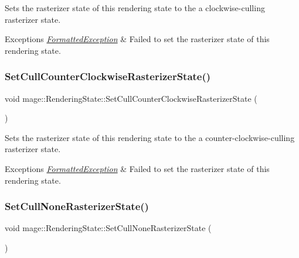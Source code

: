 Sets the rasterizer state of this rendering state to the a clockwise-\/culling rasterizer state.


\begin{DoxyExceptions}{Exceptions}
{\em \hyperlink{structmage_1_1_formatted_exception}{Formatted\+Exception}} & Failed to set the rasterizer state of this rendering state. \\
\hline
\end{DoxyExceptions}
\hypertarget{structmage_1_1_rendering_state_aa66215168ce8752ef20065b161bad1fc}{}\label{structmage_1_1_rendering_state_aa66215168ce8752ef20065b161bad1fc} 
\subsubsection{\texorpdfstring{Set\+Cull\+Counter\+Clockwise\+Rasterizer\+State()}{SetCullCounterClockwiseRasterizerState()}}
{\footnotesize\ttfamily void mage\+::\+Rendering\+State\+::\+Set\+Cull\+Counter\+Clockwise\+Rasterizer\+State (\begin{DoxyParamCaption}{ }\end{DoxyParamCaption})}

Sets the rasterizer state of this rendering state to the a counter-\/clockwise-\/culling rasterizer state.


\begin{DoxyExceptions}{Exceptions}
{\em \hyperlink{structmage_1_1_formatted_exception}{Formatted\+Exception}} & Failed to set the rasterizer state of this rendering state. \\
\hline
\end{DoxyExceptions}
\hypertarget{structmage_1_1_rendering_state_a4841e36e7be34f949da1d4088f217a1a}{}\label{structmage_1_1_rendering_state_a4841e36e7be34f949da1d4088f217a1a} 
\subsubsection{\texorpdfstring{Set\+Cull\+None\+Rasterizer\+State()}{SetCullNoneRasterizerState()}}
{\footnotesize\ttfamily void mage\+::\+Rendering\+State\+::\+Set\+Cull\+None\+Rasterizer\+State (\begin{DoxyParamCaption}{ }\end{DoxyParamCaption})}

